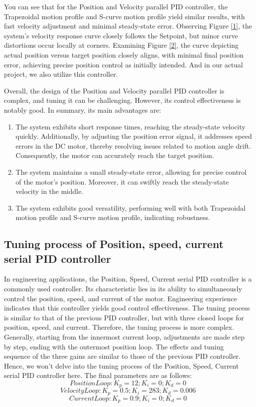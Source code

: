 \documentclass[11pt,a4paper]{article}%
\begin{document}
You can see that for the Position and Velocity parallel PID controller, the Trapezoidal motion profile and S-curve motion profile yield similar results, with fast velocity adjustment and minimal steady-state error. Observing Figure \ref{1}, the system's velocity response curve closely follows the Setpoint, but minor curve distortions occur locally at corners. Examining Figure \ref{2}, the curve depicting actual position versus target position closely aligns, with minimal final position error, achieving precise position control as initially intended. And in our actual project, we also utilize this controller.

Overall, the design of the Position and Velocity parallel PID controller is complex, and tuning it can be challenging. However, its control effectiveness is notably good. In summary, its main advantages are:
\begin{enumerate}
    \item The system exhibits short response times, reaching the steady-state velocity quickly. Additionally, by adjusting the position error signal, it addresses speed errors in the DC motor, thereby resolving issues related to motion angle drift. Consequently, the motor can accurately reach the target position.
    \item The system maintains a small steady-state error, allowing for precise control of the motor's position. Moreover, it can swiftly reach the steady-state velocity in the middle.
    \item The system exhibits good versatility, performing well with both Trapezoidal motion profile and S-curve motion profile, indicating robustness.
\end{enumerate}

\subsection{Tuning process of Position, speed, current serial PID controller}
In engineering applications, the Position, Speed, Current serial PID controller is a commonly used controller. Its characteristic lies in its ability to simultaneously control the position, speed, and current of the motor. Engineering experience indicates that this controller yields good control effectiveness. The tuning process is similar to that of the previous PID controller, but with three closed loops for position, speed, and current. Therefore, the tuning process is more complex. Generally, starting from the innermost current loop, adjustments are made step by step, ending with the outermost position loop. The effects and tuning sequence of the three gains are similar to those of the previous PID controller. Hence, we won't delve into the tuning process of the Position, Speed, Current serial PID controller here. The final parameters are as follows:
$$Position Loop:K_p=12; K_i=0; K_d=0$$
$$Velocity Loop:K_p=0.5;K_i=283;K_d=0.006$$
$$Current Loop:K_p=0.9;K_i=0;K_d=0$$
\end{document}
